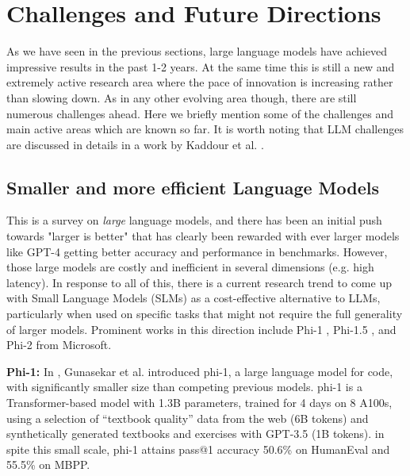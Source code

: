\documentclass[conference]{IEEEtran}
\begin{document}
\fi



\section{Challenges and Future Directions}
\label{sec:LLM_challenges}
As we have seen in the previous sections, large language models have achieved impressive results in the past 1-2 years. At the same time this is still a new and extremely active research area where the pace of innovation is increasing rather than slowing down. As in any other evolving area though, there are still numerous challenges ahead. 
Here we briefly mention some of the challenges and main active areas which are known so far.
It is worth noting that LLM challenges are discussed in details in a work by Kaddour et al. \cite{kaddour2023challenges}.


\subsection{Smaller and more efficient Language Models}

This is a survey on \emph{large} language models, and there has been an initial push towards "larger is better" that has clearly been rewarded with ever larger models like GPT-4 getting better accuracy and performance in benchmarks. However, those large models are costly and inefficient in several dimensions (e.g. high latency). In response to all of this, there is a current research trend to come up with Small Language Models (SLMs) as a cost-effective alternative to LLMs, particularly when used on specific tasks that might not require the full generality of larger models.
Prominent works in this direction include {Phi-1} \cite{gunasekar2023textbooks}, {Phi-1.5} \cite{li2023textbooks}, and {Phi-2} from Microsoft.

\iffalse
\textbf{Phi-1:} In \cite{gunasekar2023textbooks}, Gunasekar et al.  introduced phi-1, a large language model for code, with significantly smaller size than
competing previous models. phi-1 is a Transformer-based model with 1.3B parameters, trained for 4 days on 8 A100s, using a selection of “textbook quality” data from the web (6B tokens) and synthetically generated textbooks and exercises with GPT-3.5 (1B tokens). 
in spite this small scale, phi-1 attains
pass@1 accuracy 50.6\% on HumanEval and 55.5\% on MBPP. 
\end{document}
